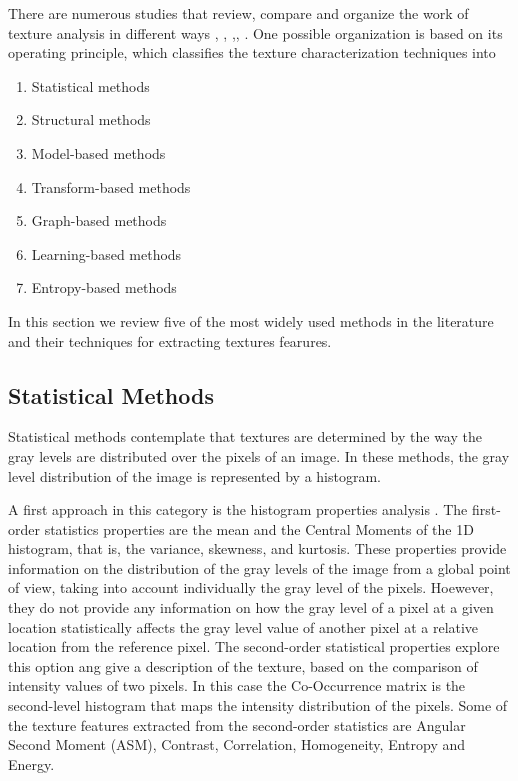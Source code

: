 There are numerous studies that review, compare and organize the work of texture analysis in different ways \citep{Materka.Strzelecki:Report:1998}, \citep{Zhang.Tan:PR:2002}, \citep{Bharati.Liu.ea:CILS:2004},\citep{Lukashevich.Sadykhov:ICPCI:2012}, \citep{Humeau-Heurtier:IEEEAccess:2019}. One possible organization is based on its operating principle, which classifies the texture characterization techniques into
 \begin{enumerate}[noitemsep]%
	\item Statistical methods
	\item Structural methods
	\item Model-based methods
	\item Transform-based methods
	\item Graph-based methods
	\item Learning-based methods
	\item Entropy-based methods
\end{enumerate}
In this section we review five of the most widely used methods in the literature and their techniques for extracting textures fearures.

\subsection{Statistical Methods}
Statistical methods contemplate that textures are determined by the way the gray levels are distributed over the pixels of an image. In these methods, the gray level distribution of the image is represented by a histogram.

A first approach in this category is the histogram properties analysis \citep{Aggarwal.K.Agrawal:JSIP:2012}. The first-order statistics properties are the mean and the Central Moments of the 1D histogram, that is, the variance, skewness, and kurtosis. These properties provide information on the distribution of the gray levels of the image from a global point of view, taking into account individually the gray level of the pixels. Hoewever, they do not provide any information on how the gray level of a pixel at a given location statistically affects the gray level value of another pixel at a relative location from the reference pixel.
The second-order statistical properties explore this option ang give a description of the texture, based on the comparison of intensity values of two pixels. In this case the Co-Occurrence matrix \citep{Haralick.Shanmugam.ea:TSMC:1973} is the second-level histogram that maps the intensity distribution of the pixels. Some of the texture features extracted from the second-order statistics are Angular Second Moment (ASM), Contrast, Correlation, Homogeneity, Entropy and Energy.

